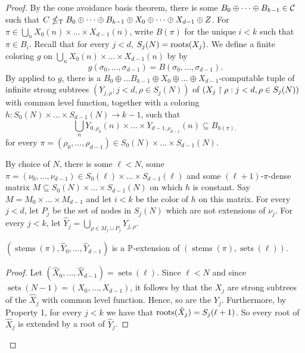 \begin{proof}
	By the cone avoidance basis theorem, there is some $B_0 \oplus \dots \oplus B_{k-1} \in \mathcal{C}$ such that $C \nleq_{\text{\upshape T}} B_0 \oplus \dots \oplus B_{k-1} \oplus X_0 \oplus \dots \oplus X_{d-1} \oplus Z$. For $\pi \in \bigcup_n X_0(n) \times \dots \times X_{d-1}(n)$, write $B(\pi)$ for the unique $i < k$ such that $\pi \in B_i$. Recall that for every $j < d$, $S_j(N) = \operatorname{roots}(X_j)$.
	We define a finite coloring $g$ on $\bigcup_n X_0(n) \times \dots \times X_{d-1}(n)$ by
	by
	\[
		g(\sigma_0,\ldots,\sigma_{d-1}) = B(\sigma_0, \dots,\sigma_{d-1}).
	\]
	By  applied to $g$,
	there is a $B_0 \oplus \dots B_{k-1} \oplus X_0 \oplus \dots \oplus X_{d-1}$-computable tuple of infinite strong subtrees $( Y_{j,\rho}: j < d, \rho \in S_j(N))$ of $( X_j \upharpoonright \rho: j < d, \rho \in S_j(N))$ with common level function, together with a coloring $h: S_0(N) \times \dots \times S_{d-1}(N) \to k-1$,
		such that
		$$
			\bigcup_n Y_{0,\rho_0}(n) \times \dots \times Y_{d-1,\rho_{d-1}}(n)  \subseteq B_{h(\pi), }
		$$
		for every $\pi = (\rho_0, \dots, \rho_{d-1}) \in S_0(N) \times \dots \times S_{d-1}(N)$.

	By choice of $N$, there is some $\ell < N$, some $\pi = (\nu_0, \dots, \nu_{d-1}) \in S_0(\ell) \times \dots \times S_{d-1}(\ell)$ and some $(\ell+1)$-$\pi$-dense matrix $M \subseteq S_0(N) \times \dots \times S_{d-1}(N)$ on which $h$ is constant. Say $M = M_0 \times \dots \times M_{d-1}$ and let $i < k$ be the color of $h$ on this matrix.
	For every $j < d$, let $P_j$ be the set of nodes in $S_j(N)$ which are not extensions of $\nu_j$. For every $j < k$, let $\hat{Y}_j = \bigcup_{\rho \in M_j \cup P_j} Y_{j,\rho}$.

	\begin{claim}\label{fact:hl-sca-case2-exts}
	$(\operatorname{stems}(\pi), \hat{Y}_0, \dots, \hat{Y}_{d-1})$
	is a $\mathbb{P}$-extension of $(\operatorname{stems}(\pi), \operatorname{sets}(\ell))$.
	\end{claim}
	\begin{proof}
	Let $(\hat{X}_0, \dots, \hat{X}_{d-1}) = \operatorname{sets}(\ell)$. Since $\ell < N$ and since $\operatorname{sets}(N-1) = (X_0,\ldots,X_{d-1})$, it follows by  that the $X_j$ are strong subtrees of the $\hat{X}_j$ with common level function. Hence, so are the $Y_j$. Furthermore, by Property 1, for every $j < k$ we have that $\operatorname{roots}(\hat{X}_j) = S_j(\ell+1)$. So every root of $\hat{X}_j$ is extended by a root of $\hat{Y}_j$.
	\end{proof}


\end{proof}
